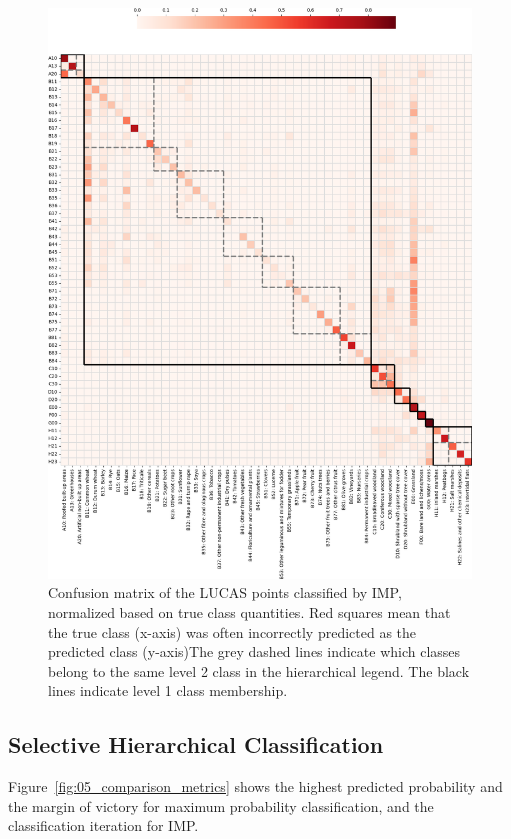     \begin{figure}
        \centering
        \includegraphics[width=\textwidth]{figs_05/fig_hierarchical_confusion_matrix_calib.png}
        \caption{Confusion matrix of the LUCAS points classified by IMP, normalized based on true class quantities. Red squares mean that the true class (x-axis) was often incorrectly predicted as the predicted class (y-axis)The grey dashed lines indicate which classes belong to the same level 2 class in the hierarchical legend. The black lines indicate level 1 class membership.}
        \label{fig:05_confusion_matrix}
    \end{figure}

    \subsection{Selective Hierarchical Classification}

        Figure~\ref{fig:05_comparison_metrics} shows the highest predicted probability and the margin of victory for maximum probability classification, and the classification iteration for IMP.
        

